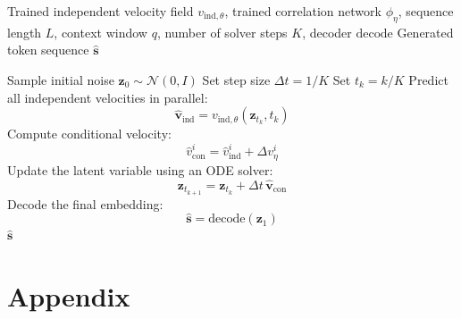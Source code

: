\documentclass{article} %
\begin{document}
\begin{algorithm}[t]
\caption{Inference with Correlation-aware Flow}
\label{alg:inference}
\begin{algorithmic}[1]
\Require Trained independent velocity field $v_{\mathrm{ind},\theta}$, trained correlation network $\phi_\eta$, sequence length $L$, context window $q$, number of solver steps $K$, decoder $\mathrm{decode}$
\Ensure Generated token sequence $\widehat{\mathbf{s}}$

\State Sample initial noise $\mathbf{z}_0 \sim \mathcal{N}(0,I)$
\State Set step size $\Delta t = 1/K$
    \State Set $t_k = k/K$
    \State Predict all independent velocities in parallel:
    \[
        \widehat{\mathbf{v}}_{\mathrm{ind}}
        =
        v_{\mathrm{ind},\theta}(\mathbf{z}_{t_k},t_k)
    \]
    \State Compute conditional velocity:
        \[
            \widehat{v}^{i}_{\mathrm{con}}
            =
            \widehat{v}^{i}_{\mathrm{ind}}
            +
            \Delta v^i_\eta
        \]
    \State Update the latent variable using an ODE solver:
    \[
        \mathbf{z}_{t_{k+1}}
        =
        \mathbf{z}_{t_k}
        +
        \Delta t \,
        \widehat{\mathbf{v}}_{\mathrm{con}}
    \]
\EndFor
\State Decode the final embedding:
\[
    \widehat{\mathbf{s}}
    =
    \mathrm{decode}(\mathbf{z}_1)
\]
\State \Return $\widehat{\mathbf{s}}$
\end{algorithmic}
\end{algorithm}

\newpage



\appendix
\section{Appendix}
\end{document}
